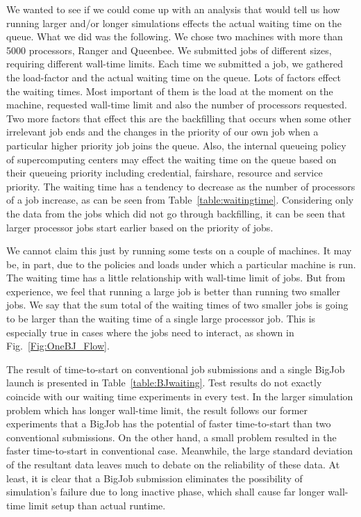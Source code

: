 \documentclass[conference,final]{IEEEtran}
\begin{document}
We wanted to see if we could come up with an analysis that would tell
us how running larger and/or longer simulations effects the actual
waiting time on the queue. What we did was the following. We chose two machines with more than
5000 processors, Ranger and Queenbee. We submitted jobs of different
sizes, requiring different wall-time limits. Each time we submitted a
job, we gathered the load-factor and the actual waiting time on the
queue. Lots of factors effect the waiting times. Most important of
them is the load at the moment on the machine, requested wall-time
limit and also the number of processors requested. Two more factors
that effect this are the backfilling that occurs when some other
irrelevant job ends and the changes in the priority of our own job
when a particular higher priority job joins the queue.  Also, the internal queueing policy of supercomputing centers may effect the waiting time on the queue based on  their queueing priority  including credential, fairshare, resource and service priority. The waiting
time has a tendency to decrease as the number of processors of a job
increase, as can be seen from Table~\ref{table:waitingtime}.
Considering only the data from the jobs which did not go through
backfilling, it can be seen that larger processor jobs start earlier
based on the priority of jobs. 

We cannot claim this just by running some tests on a couple of
machines. It may be, in part, due to the policies and loads under
which a particular machine is run. The waiting time has a little
relationship with wall-time limit of jobs. But from experience, we
feel that running a large job is better than running two smaller
jobs. We say that the sum total of the waiting times of two smaller
jobs is going to be larger than the waiting time of a single large
processor job. This is especially true in cases where the jobs need to
interact, as shown in Fig.~\ref{Fig:OneBJ_Flow}.


The result of time-to-start on conventional job submissions and a
single BigJob launch is presented in Table~\ref{table:BJwaiting}. Test
results do not exactly coincide with our waiting time experiments in
every test. In the larger simulation problem which has longer
wall-time limit, the result follows our former experiments that a
BigJob has the potential of faster time-to-start than two conventional
submissions. On the other hand, a small problem resulted in the faster
time-to-start in conventional case.
Meanwhile, the large standard deviation of the resultant data leaves
much to debate on the reliability of these data. At least, it is clear
that a BigJob submission eliminates the possibility of simulation's
failure due to long inactive phase, which shall cause far longer
wall-time limit setup than actual runtime.
\end{document}
